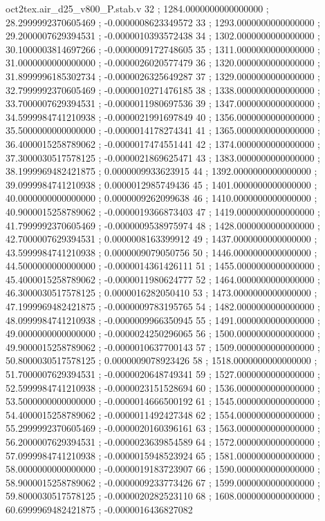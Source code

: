 \begin{filecontents}[overwrite]{oct2tex.air_d25_v800_P.stab.v}
32 ; 1284.0000000000000000 ; 28.2999992370605469 ; -0.0000008623349572
33 ; 1293.0000000000000000 ; 29.2000007629394531 ; -0.0000010393572438
34 ; 1302.0000000000000000 ; 30.1000003814697266 ; -0.0000009172748605
35 ; 1311.0000000000000000 ; 31.0000000000000000 ; -0.0000026020577479
36 ; 1320.0000000000000000 ; 31.8999996185302734 ; -0.0000026325649287
37 ; 1329.0000000000000000 ; 32.7999992370605469 ; -0.0000010271476185
38 ; 1338.0000000000000000 ; 33.7000007629394531 ; -0.0000011980697536
39 ; 1347.0000000000000000 ; 34.5999984741210938 ; -0.0000021991697849
40 ; 1356.0000000000000000 ; 35.5000000000000000 ; -0.0000014178274341
41 ; 1365.0000000000000000 ; 36.4000015258789062 ; -0.0000017474551441
42 ; 1374.0000000000000000 ; 37.3000030517578125 ; -0.0000021869625471
43 ; 1383.0000000000000000 ; 38.1999969482421875 ; 0.0000009933623915
44 ; 1392.0000000000000000 ; 39.0999984741210938 ; 0.0000012985749436
45 ; 1401.0000000000000000 ; 40.0000000000000000 ; 0.0000009262099638
46 ; 1410.0000000000000000 ; 40.9000015258789062 ; -0.0000019366873403
47 ; 1419.0000000000000000 ; 41.7999992370605469 ; -0.0000009538975974
48 ; 1428.0000000000000000 ; 42.7000007629394531 ; 0.0000008163399912
49 ; 1437.0000000000000000 ; 43.5999984741210938 ; 0.0000009079050756
50 ; 1446.0000000000000000 ; 44.5000000000000000 ; -0.0000014361426111
51 ; 1455.0000000000000000 ; 45.4000015258789062 ; -0.0000011980624777
52 ; 1464.0000000000000000 ; 46.3000030517578125 ; 0.0000016282050410
53 ; 1473.0000000000000000 ; 47.1999969482421875 ; -0.0000009783195765
54 ; 1482.0000000000000000 ; 48.0999984741210938 ; -0.0000009966350945
55 ; 1491.0000000000000000 ; 49.0000000000000000 ; -0.0000024250296065
56 ; 1500.0000000000000000 ; 49.9000015258789062 ; -0.0000010637700143
57 ; 1509.0000000000000000 ; 50.8000030517578125 ; 0.0000009078923426
58 ; 1518.0000000000000000 ; 51.7000007629394531 ; -0.0000020648749341
59 ; 1527.0000000000000000 ; 52.5999984741210938 ; -0.0000023151528694
60 ; 1536.0000000000000000 ; 53.5000000000000000 ; -0.0000014666500192
61 ; 1545.0000000000000000 ; 54.4000015258789062 ; -0.0000011492427348
62 ; 1554.0000000000000000 ; 55.2999992370605469 ; -0.0000020160396161
63 ; 1563.0000000000000000 ; 56.2000007629394531 ; -0.0000023639854589
64 ; 1572.0000000000000000 ; 57.0999984741210938 ; -0.0000015948523924
65 ; 1581.0000000000000000 ; 58.0000000000000000 ; -0.0000019183723907
66 ; 1590.0000000000000000 ; 58.9000015258789062 ; -0.0000009233773426
67 ; 1599.0000000000000000 ; 59.8000030517578125 ; -0.0000020282523110
68 ; 1608.0000000000000000 ; 60.6999969482421875 ; -0.0000016436827082

\end{filecontents}

